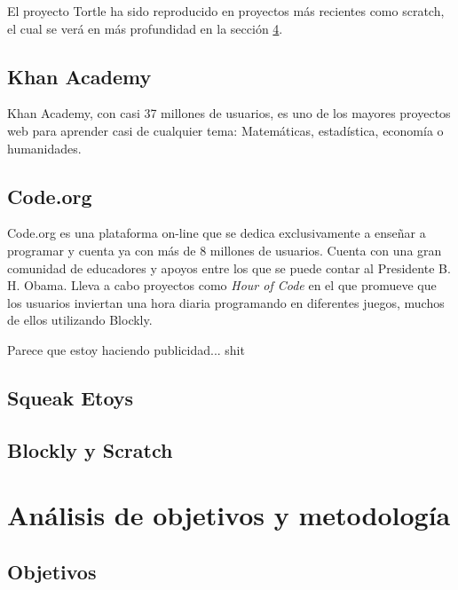 El proyecto Tortle ha sido reproducido en proyectos más recientes como \Gls{scratch}\cite{scratch}, el cual se verá en más profundidad en la sección \ref{sec:blockly-scratch}.



\section{Khan Academy}
\label{sec:Khan Academy}

Khan Academy\cite{khan-academy}, con casi 37 millones de usuarios, es uno de los mayores proyectos web para aprender casi de cualquier tema: Matemáticas, estadística, economía o humanidades.


\section{Code.org}
\label{sec:Code.org}

Code.org\cite{code-org} es una plataforma on-line que se dedica exclusivamente a enseñar a programar y cuenta ya con más de 8 millones de usuarios. Cuenta con una gran comunidad de educadores y apoyos entre los que se puede contar al Presidente B. H. Obama. Lleva a cabo proyectos como \emph{Hour of Code} en el que promueve que los usuarios inviertan una hora diaria programando en diferentes juegos, muchos de ellos utilizando \Gls{Blockly}\cite{blockly}.

{\color{red} Parece que estoy haciendo publicidad... shit}


\section{Squeak Etoys}
\label{sec:squeak-etoys}


\section{Blockly y Scratch}
\label{sec:blockly-scratch}


\chapter{Análisis de objetivos y metodología}\label{objetivos-metodologia}

\section{Objetivos}
\label{sec:Objetivos}

